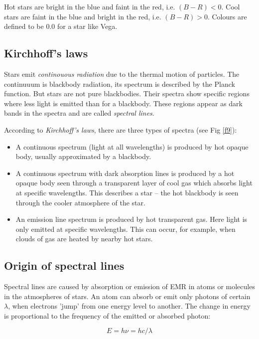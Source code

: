 Hot stars are bright in the blue and faint in the red, i.e. $(B-R)<0$. Cool stars are faint in the blue and bright in the red, i.e. $(B-R)>0$. Colours are defined to be 0.0 for a star like Vega.

\subsection{Kirchhoff's laws}

Stars emit \textit{continouous radiation} due to the thermal motion of particles. The continuuum is blackbody radiation, its spectrum is described by the Planck function. But stars are not pure blackbodies. Their spectra show specific regions where less light is emitted than for a blackbody. These regions appear as dark bands in the spectra and are called \textit{spectral lines}.

According to \textit{Kirchhoff's laws}, there are three types of spectra (see Fig \ref{f9}):

\begin{itemize}
\item{A continuous spectrum (light at all wavelengths) is produced by hot opaque body, usually approximated by a blackbody.}
\item{A continuous spectrum with dark absorption lines is produced by a hot opaque body seen through a transparent layer of cool gas which absorbs light at specific wavelengths. This describes a star -- the hot blackbody is seen through the cooler atmosphere of the star.}
\item{An emission line spectrum is produced by hot transparent gas. Here light is only emitted at specific wavelengths. This can occur, for example, when clouds of gas are heated by nearby hot stars.}
\end{itemize}

\subsection{Origin of spectral lines}

Spectral lines are caused by absorption or emission of EMR in atoms or molecules in the atmospheres of stars. An atom can absorb or emit only photons of certain $\lambda$, when electrons 'jump' from one energy level to another. The change in energy is proportional to the frequency of the emitted or absorbed photon:

\begin{equation}
E = h \nu = h c / \lambda
\label{eq20}
\end{equation}

